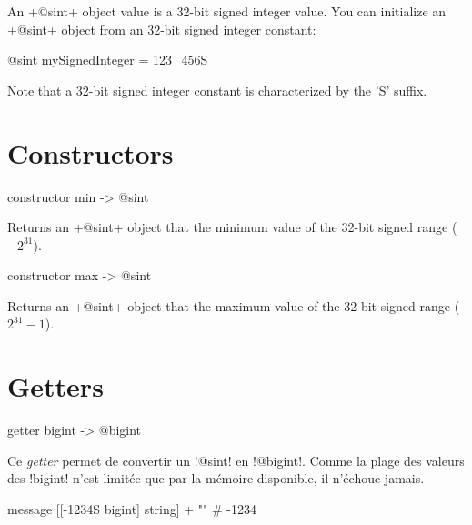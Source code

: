 

\tableDesMatieresDuChapitre


An \ggs+@sint+ object value is a 32-bit signed integer value. You can initialize an \ggs+@sint+ object from an 32-bit signed integer constant:\\

\begin{galgas}
@sint mySignedInteger = 123_456S
\end{galgas}


Note that a 32-bit signed integer constant is characterized by the 'S' suffix.


\section{Constructors}


\begin{galgas}
constructor min -> @sint
\end{galgas}

Returns an \ggs+@sint+ object that the minimum value of the 32-bit signed range ($-2^{31}$).






\begin{galgas}
constructor max -> @sint
\end{galgas}


Returns an \ggs+@sint+ object that the maximum value of the 32-bit signed range ($2^{31}-1$).



\section{Getters}


\begin{galgasbox}
getter bigint -> @bigint
\end{galgasbox}

Ce \emph{getter} permet de convertir un \ggs!@sint! en \ggs!@bigint!. Comme la plage des valeurs des \ggs!bigint! n'est limitée que par la mémoire disponible, il n'échoue jamais.

\begin{galgas}
  message [[-1234S bigint] string] + "\n" # -1234
\end{galgas}


